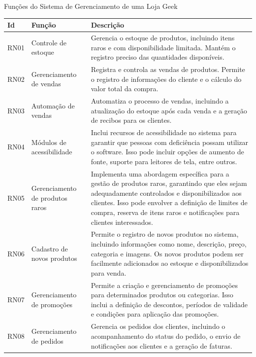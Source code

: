 \documentclass[
	12pt,				%
	openright,			%
	twoside,			%
	a4paper,			%
	english,			%
	brazil				%
	]{abntex2}
\begin{document}
\begin{quadro}[htb]
	\centering
	\caption{\label{quadro_funcoes}Funções do Sistema de Gerenciamento de uma Loja Geek}
	\begin{tabular}{|p{2cm}|p{4cm}|p{6cm}|}
		\hline
		\textbf{Id} & \textbf{Função} & \textbf{Descrição} \\ \hline
		RN01 & Controle de estoque & Gerencia o estoque de produtos, incluindo itens raros e com disponibilidade limitada. Mantém o registro preciso das quantidades disponíveis. \\ \hline
		RN02 & Gerenciamento de vendas & Registra e controla as vendas de produtos. Permite o registro de informações do cliente e o cálculo do valor total da compra. \\ \hline
		RN03 & Automação de vendas & Automatiza o processo de vendas, incluindo a atualização do estoque após cada venda e a geração de recibos para os clientes. \\ \hline
		RN04 & Módulos de acessibilidade & Inclui recursos de acessibilidade no sistema para garantir que pessoas com deficiência possam utilizar o software. Isso pode incluir opções de aumento de fonte, suporte para leitores de tela, entre outros. \\ \hline
		RN05 & Gerenciamento de produtos raros & Implementa uma abordagem específica para a gestão de produtos raros, garantindo que eles sejam adequadamente controlados e disponibilizados aos clientes. Isso pode envolver a definição de limites de compra, reserva de itens raros e notificações para clientes interessados. \\ \hline
		RN06 & Cadastro de novos produtos & Permite o registro de novos produtos no sistema, incluindo informações como nome, descrição, preço, categoria e imagens. Os novos produtos podem ser facilmente adicionados ao estoque e disponibilizados para venda. \\ \hline
		RN07 & Gerenciamento de promoções & Permite a criação e gerenciamento de promoções para determinados produtos ou categorias. Isso inclui a definição de descontos, períodos de validade e condições para aplicação das promoções. \\ \hline
		RN08 & Gerenciamento de pedidos & Gerencia os pedidos dos clientes, incluindo o acompanhamento do status do pedido, o envio de notificações aos clientes e a geração de faturas. \\ \hline
	\end{tabular}
\end{quadro}
\end{document}
